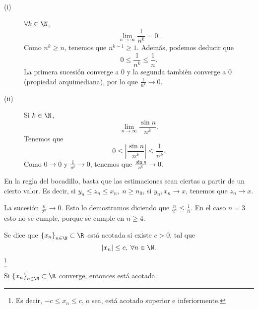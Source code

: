 \begin{eg}
\normalfont 
\begin{description}
\item[(i)] $\displaystyle \forall k \in \N $, 
	\[\lim_{n \to \infty}\frac{1}{n^{k}} =0 .\]
Como $\displaystyle n^{k} \geq n $, tenemos que $\displaystyle n^{k-1} \geq 1 $. Además, podemos deducir que 
\[0 \leq \frac{1}{n^{k}} \leq \frac{1}{n} .\]
La primera sucesión converge a 0 y la segunda también converge a 0 (propiedad arquimediana), por lo que $\displaystyle \frac{1}{n^{k}} \to 0 $.
\item[(ii)] Si $\displaystyle k \in \N $, 
	\[\lim_{n \to \infty}\frac{\sin n}{n^{k}} .\]
Tenemos que
\[ 0 \leq \left|\frac{\sin n}{n^{k}}\right| \leq \frac{1}{n^{k}} .\]
Como $\displaystyle 0 \to 0 $ y $\displaystyle \frac{1}{n^{k}} \to 0 $, tenemos que $\displaystyle \frac{\sin n}{n^{k}} \to 0 $.
\end{description}
\end{eg}

\begin{observation}
\normalfont En la regla del bocadillo, basta que las estimaciones sean ciertas a partir de un cierto valor. Es decir, si $\displaystyle y_{n} \leq z_{n} \leq x_{n}, \; n\geq n_{0} $, si $\displaystyle y_{n}, x_{n} \to x $, tenemos que $\displaystyle z_{n} \to x $.
\end{observation}

\begin{eg}
\normalfont La sucesión $\displaystyle \frac{n}{2^{n}} \to 0$. Esto lo demostramos diciendo que $\displaystyle \frac{n}{2^{n}} \leq \frac{1}{n} $. En el caso $\displaystyle n = 3 $ esto no se cumple, porque se cumple en $\displaystyle n\geq 4 $. 
\end{eg}

\begin{fdefinition}[]
	\normalfont Se dice que $\displaystyle \left\{ x_{n}\right\}_{n\in\N}  \subset \R$ está acotada si existe $\displaystyle c > 0 $, tal que 
	\[ \left|x_{n}\right| \leq c, \; \forall n \in \N .\]
\footnote{Es decir, $\displaystyle -c \leq x_{n} \leq c $, o sea, está acotado superior e inferiormente.} 
\end{fdefinition}

\begin{ftheorem}[]
	\normalfont Si $\displaystyle \left\{ x_{n}\right\} _{n\in\N} \subset \R $ converge, entonces está acotada. 
\end{ftheorem}

